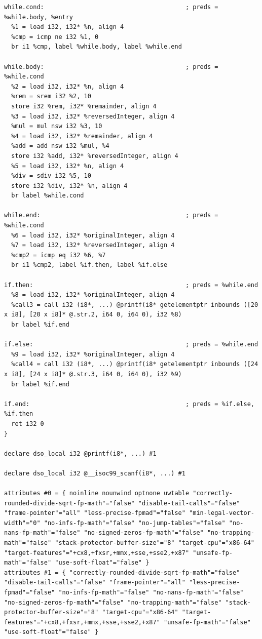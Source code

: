 \documentclass[12pt]{article}
\begin{document}
\begin{itemize}
\begin{lstlisting}[style=CStyle]
while.cond:                                       ; preds = %while.body, %entry
  %1 = load i32, i32* %n, align 4
  %cmp = icmp ne i32 %1, 0
  br i1 %cmp, label %while.body, label %while.end

while.body:                                       ; preds = %while.cond
  %2 = load i32, i32* %n, align 4
  %rem = srem i32 %2, 10
  store i32 %rem, i32* %remainder, align 4
  %3 = load i32, i32* %reversedInteger, align 4
  %mul = mul nsw i32 %3, 10
  %4 = load i32, i32* %remainder, align 4
  %add = add nsw i32 %mul, %4
  store i32 %add, i32* %reversedInteger, align 4
  %5 = load i32, i32* %n, align 4
  %div = sdiv i32 %5, 10
  store i32 %div, i32* %n, align 4
  br label %while.cond

while.end:                                        ; preds = %while.cond
  %6 = load i32, i32* %originalInteger, align 4
  %7 = load i32, i32* %reversedInteger, align 4
  %cmp2 = icmp eq i32 %6, %7
  br i1 %cmp2, label %if.then, label %if.else

if.then:                                          ; preds = %while.end
  %8 = load i32, i32* %originalInteger, align 4
  %call3 = call i32 (i8*, ...) @printf(i8* getelementptr inbounds ([20 x i8], [20 x i8]* @.str.2, i64 0, i64 0), i32 %8)
  br label %if.end

if.else:                                          ; preds = %while.end
  %9 = load i32, i32* %originalInteger, align 4
  %call4 = call i32 (i8*, ...) @printf(i8* getelementptr inbounds ([24 x i8], [24 x i8]* @.str.3, i64 0, i64 0), i32 %9)
  br label %if.end

if.end:                                           ; preds = %if.else, %if.then
  ret i32 0
}

declare dso_local i32 @printf(i8*, ...) #1

declare dso_local i32 @__isoc99_scanf(i8*, ...) #1

attributes #0 = { noinline nounwind optnone uwtable "correctly-rounded-divide-sqrt-fp-math"="false" "disable-tail-calls"="false" "frame-pointer"="all" "less-precise-fpmad"="false" "min-legal-vector-width"="0" "no-infs-fp-math"="false" "no-jump-tables"="false" "no-nans-fp-math"="false" "no-signed-zeros-fp-math"="false" "no-trapping-math"="false" "stack-protector-buffer-size"="8" "target-cpu"="x86-64" "target-features"="+cx8,+fxsr,+mmx,+sse,+sse2,+x87" "unsafe-fp-math"="false" "use-soft-float"="false" }
attributes #1 = { "correctly-rounded-divide-sqrt-fp-math"="false" "disable-tail-calls"="false" "frame-pointer"="all" "less-precise-fpmad"="false" "no-infs-fp-math"="false" "no-nans-fp-math"="false" "no-signed-zeros-fp-math"="false" "no-trapping-math"="false" "stack-protector-buffer-size"="8" "target-cpu"="x86-64" "target-features"="+cx8,+fxsr,+mmx,+sse,+sse2,+x87" "unsafe-fp-math"="false" "use-soft-float"="false" }


\end{lstlisting}
\end{itemize}
\end{document}
